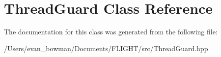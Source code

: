 \hypertarget{class_thread_guard}{}\section{Thread\+Guard Class Reference}
\label{class_thread_guard}


The documentation for this class was generated from the following file\+:\begin{DoxyCompactItemize}
\item 
/\+Users/evan\+\_\+bowman/\+Documents/\+F\+L\+I\+G\+H\+T/src/Thread\+Guard.\+hpp\end{DoxyCompactItemize}
